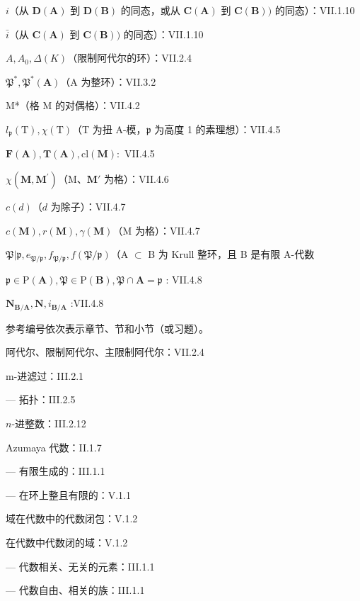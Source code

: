 \(i\)（从 \(\mathbf{D}(\mathbf{A})\) 到 \(\mathbf{D}(\mathbf{B})\) 的同态，或从 \(\mathbf{C}(\mathbf{A})\) 到 \(\mathbf{C}(\mathbf{B}))\) 的同态）：VII.1.10

\(\bar{i}\)（从 \(\mathbf{C}(\mathbf{A})\) 到 \(\mathbf{C}(\mathbf{B}))\) 的同态）：VII.1.10

\(A, A_{0}, \Delta(K)\)（限制阿代尔的环）：VII.2.4

\(\mathfrak{P}^*, \mathfrak{P}^*(\mathbf{A})\)（A 为整环）：VII.3.2

M*（格 M 的对偶格）：VII.4.2

\(l_{\mathfrak{p}}(\mathrm{T}), \chi (\mathrm{T})\)（T 为扭 A-模，\(\mathfrak{p}\) 为高度 1 的素理想）：VII.4.5

\(\pmb {F}(\mathbf{A}),\pmb{T}(\mathbf{A}),\mathrm{cl}(\mathbf{M}):\) VII.4.5

\(\chi (\mathbf{M},\mathbf{M}^{\prime})\)（M、\(\mathbf{M}'\) 为格）：VII.4.6

\(c(d)\)（\(d\) 为除子）：VII.4.7

\(c(\mathbf{M}), r(\mathbf{M}), \gamma(\mathbf{M})\)（M 为格）：VII.4.7

\(\mathfrak{P}|\mathfrak{p},e_{\mathfrak{P} / \mathfrak{p}},f_{\mathfrak{P} / \mathfrak{p}},f(\mathfrak{P} / \mathfrak{p})\)（A \(\subset\) B 为 Krull 整环，且 B 是有限 A-代数

\(\mathfrak{p} \in \mathrm{P}(\mathbf{A}), \mathfrak{P} \in \mathrm{P}(\mathbf{B}), \mathfrak{P} \cap \mathbf{A} = \mathfrak{p}\) : VII.4.8

\(\mathbf{N}_{\mathbf{B} / \mathbf{A}},\mathbf{N},i_{\mathbf{B} / \mathbf{A}}\) :VII.4.8


参考编号依次表示章节、节和小节（或习题）。

阿代尔、限制阿代尔、主限制阿代尔：VII.2.4

m-进滤过：III.2.1

--- 拓扑：III.2.5

\(n\)-进整数：III.2.12

Azumaya 代数：II.1.7

--- 有限生成的：III.1.1

--- 在环上整且有限的：V.1.1

域在代数中的代数闭包：V.1.2

在代数中代数闭的域：V.1.2

--- 代数相关、无关的元素：III.1.1

--- 代数自由、相关的族：III.1.1

